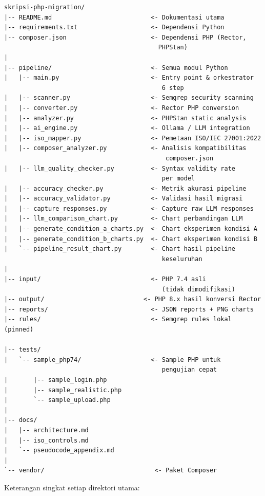 \begin{lstlisting}[style=pseudocodestyle]
skripsi-php-migration/
|-- README.md                           <- Dokumentasi utama
|-- requirements.txt                    <- Dependensi Python
|-- composer.json                       <- Dependensi PHP (Rector, 
                                          PHPStan)
|
|-- pipeline/                           <- Semua modul Python
|   |-- main.py                         <- Entry point & orkestrator 
                                           6 step
|   |-- scanner.py                      <- Semgrep security scanning
|   |-- converter.py                    <- Rector PHP conversion
|   |-- analyzer.py                     <- PHPStan static analysis
|   |-- ai_engine.py                    <- Ollama / LLM integration
|   |-- iso_mapper.py                   <- Pemetaan ISO/IEC 27001:2022
|   |-- composer_analyzer.py            <- Analisis kompatibilitas 
                                            composer.json
|   |-- llm_quality_checker.py          <- Syntax validity rate 
                                           per model
|   |-- accuracy_checker.py             <- Metrik akurasi pipeline
|   |-- accuracy_validator.py           <- Validasi hasil migrasi
|   |-- capture_responses.py            <- Capture raw LLM responses
|   |-- llm_comparison_chart.py         <- Chart perbandingan LLM
|   |-- generate_condition_a_charts.py  <- Chart eksperimen kondisi A
|   |-- generate_condition_b_charts.py  <- Chart eksperimen kondisi B
|   `-- pipeline_result_chart.py        <- Chart hasil pipeline 
                                           keseluruhan
|
|-- input/                              <- PHP 7.4 asli 
                                           (tidak dimodifikasi)
|-- output/                           <- PHP 8.x hasil konversi Rector
|-- reports/                            <- JSON reports + PNG charts
|-- rules/                              <- Semgrep rules lokal (pinned)

|-- tests/
|   `-- sample_php74/                   <- Sample PHP untuk 
                                           pengujian cepat
|       |-- sample_login.php
|       |-- sample_realistic.php
|       `-- sample_upload.php
|
|-- docs/
|   |-- architecture.md
|   |-- iso_controls.md
|   `-- pseudocode_appendix.md
|
`-- vendor/                              <- Paket Composer
\end{lstlisting}


Keterangan singkat setiap direktori utama:

